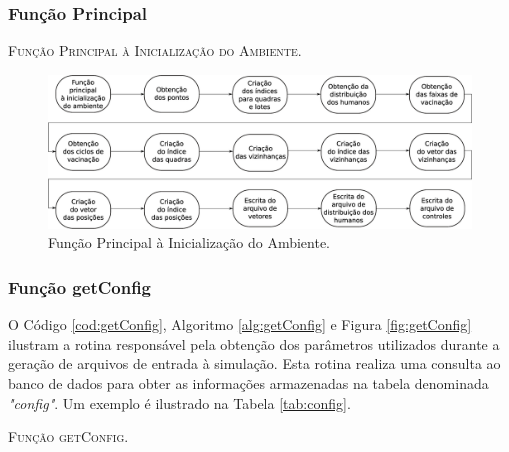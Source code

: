 \subsubsection{Função Principal}



\begin{algorithm}[H]
   \SetAlgoLined   
   
   \caption{\textsc{Função Principal à Inicialização do Ambiente.}}
   \label{alg:mainAmb}
\end{algorithm}

\begin{figure}[H]
  \centering
  \includegraphics[width=1\textwidth]{Figuras/Simula/Fluxos/Main.eps}
  \caption{Função Principal à Inicialização do Ambiente.}
  \label{fig:mainAmb}
\end{figure} 

\newpage

\subsubsection{Função getConfig}

O Código \ref{cod:getConfig}, Algoritmo \ref{alg:getConfig} e Figura \ref{fig:getConfig} ilustram a rotina responsável pela obtenção dos parâmetros utilizados durante a geração de arquivos de entrada à simulação. Esta rotina realiza uma consulta ao banco de dados para obter as informações armazenadas na tabela denominada \textit{"config"}. Um exemplo é ilustrado na Tabela \ref{tab:config}. 



\begin{algorithm}[H]
   \SetAlgoLined   
   
   \caption{\textsc{Função getConfig.}}
   \label{alg:getConfig}
\end{algorithm}

